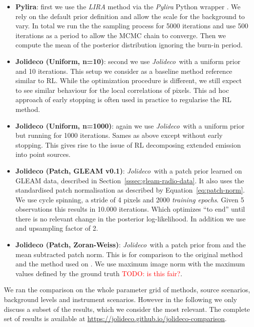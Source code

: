 \documentclass[twocolumn]{aastex631}
\newcommand{\jolideco}{\textit{Jolideco}~}
\newcommand{\todo}[1]{\textcolor{red}{TODO: #1}\PackageWarning{TODO:}{#1!}}
\begin{document}
    \begin{itemize}
        \item \textbf{Pylira}: first we use the \textit{LIRA} method \citep{Esch2004} via the \textit{Pylira} Python wrapper \citep{Donath2022}. We rely on the default prior definition and allow the scale for the background to vary. In total we run the the sampling process for 5000 iterations and use 500 iterations as a  period to allow the MCMC chain to converge. Then we compute the mean of the posterior distribution ignoring the burn-in period.
        
        \item \textbf{Jolideco (Uniform, n=10)}: second we use \jolideco with a uniform prior and 10 iterations. This setup we consider as a baseline method reference similar to RL. While the optimization procedure is different, we still expect to see similar behaviour for the local correlations of pixels. This ad hoc approach of early stopping is often used in practice to regularise the RL method.
        
        \item \textbf{Jolideco (Uniform, n=1000)}: again we use \jolideco with a uniform prior but running for 1000 iterations. Sames as above except without early stopping. This gives rise to the issue of RL decomposing extended emission into point sources. 
        
        \item \textbf{Jolideco (Patch, GLEAM v0.1)}: \jolideco with a patch prior learned on GLEAM data, described in Section~\ref{sssec:gleam-radio-data}. It also uses the standardised patch normalisation as described by Equation~\ref{eq:patch-norm}. We use cycle spinning, a stride of 4 pixels and 2000 \textit{training epochs}. Given 5 observations this results in 10.000 iterations. Which optimizes \enquote{to end} until there is no relevant change in the posterior log-likelihood. In addition we use and upsampling factor of 2.
        
        \item \textbf{Jolideco (Patch, Zoran-Weiss)}: \jolideco with a patch prior from \cite{Zoran2011} and the mean subtracted patch norm. This is for comparison to the original method and the method used on \cite{Bouman2016}. We use maximum image norm with the maximum values defined by the ground truth \todo{is this fair?}.
    \end{itemize}

    We ran the comparison on the whole parameter grid of methods, source scenarios, background levels and instrument scenarios. However in the following we only discuss a subset of the results, which we consider the most relevant. The complete set of results is available at \url{https://jolideco.github.io/jolideco-comparison}.
\end{document}
